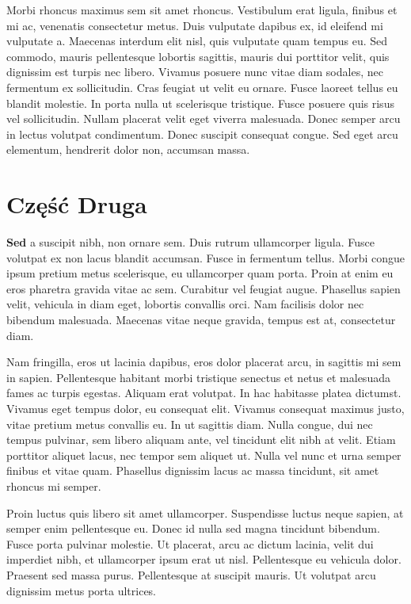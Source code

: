 \documentclass[]{article}
\begin{document}
Morbi rhoncus maximus sem sit amet rhoncus. Vestibulum erat ligula, finibus et mi ac, venenatis consectetur metus. Duis vulputate dapibus ex, id eleifend mi vulputate a. Maecenas interdum elit nisl, quis vulputate quam tempus eu. Sed commodo, mauris pellentesque lobortis sagittis, mauris dui porttitor velit, quis dignissim est turpis nec libero. Vivamus posuere nunc vitae diam sodales, nec fermentum ex sollicitudin. Cras feugiat ut velit eu ornare. Fusce laoreet tellus eu blandit molestie. In porta nulla ut scelerisque tristique. Fusce posuere quis risus vel sollicitudin. Nullam placerat velit eget viverra malesuada. Donec semper arcu in lectus volutpat condimentum. Donec suscipit consequat congue. Sed eget arcu elementum, hendrerit dolor non, accumsan massa.
\newpage
\section{Część Druga}
\textbf{Sed} a suscipit nibh, non ornare sem. Duis rutrum ullamcorper ligula. Fusce volutpat ex non lacus blandit accumsan. Fusce in fermentum tellus. Morbi congue ipsum pretium metus scelerisque, eu ullamcorper quam porta. Proin at enim eu eros pharetra gravida vitae ac sem. Curabitur vel feugiat augue. Phasellus sapien velit, vehicula in diam eget, lobortis convallis orci. Nam facilisis dolor nec bibendum malesuada. Maecenas vitae neque gravida, tempus est at, consectetur diam.

Nam fringilla, eros ut lacinia dapibus, eros dolor placerat arcu, in sagittis mi sem in sapien. Pellentesque habitant morbi tristique senectus et netus et malesuada fames ac turpis egestas. Aliquam erat volutpat. In hac habitasse platea dictumst. Vivamus eget tempus dolor, eu consequat elit. Vivamus consequat maximus justo, vitae pretium metus convallis eu. In ut sagittis diam. Nulla congue, dui nec tempus pulvinar, sem libero aliquam ante, vel tincidunt elit nibh at velit. Etiam porttitor aliquet lacus, nec tempor sem aliquet ut. Nulla vel nunc et urna semper finibus et vitae quam. Phasellus dignissim lacus ac massa tincidunt, sit amet rhoncus mi semper.

Proin luctus quis libero sit amet ullamcorper. Suspendisse luctus neque sapien, at semper enim pellentesque eu. Donec id nulla sed magna tincidunt bibendum. Fusce porta pulvinar molestie. Ut placerat, arcu ac dictum lacinia, velit dui imperdiet nibh, et ullamcorper ipsum erat ut nisl. Pellentesque eu vehicula dolor. Praesent sed massa purus. Pellentesque at suscipit mauris. Ut volutpat arcu dignissim metus porta ultrices.
\end{document}
